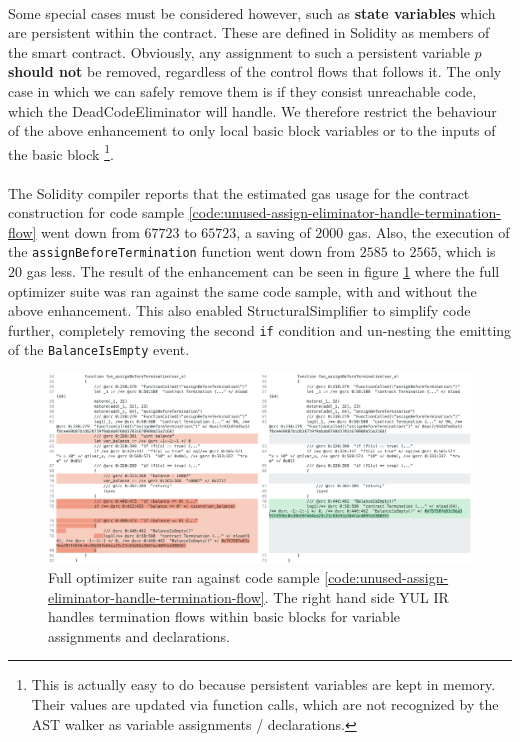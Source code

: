 \paragraph*{}
Some special cases must be considered however, such as \textbf{state variables} which are persistent within the contract. These are defined in Solidity as members of the smart contract. Obviously, any assignment to such a persistent variable $p$ \textbf{should not} be removed, regardless of the control flows that follows it. The only case in which we can safely remove them is if they consist unreachable code, which the DeadCodeEliminator will handle. We therefore restrict the behaviour of the above enhancement to only local basic block variables or to the inputs of the basic block \footnote{This is actually easy to do because persistent variables are kept in memory. Their values are updated via function calls, which are not recognized by the AST walker as variable assignments / declarations.}.

\paragraph*{}
The Solidity compiler reports that the estimated gas usage for the contract construction for code sample \ref*{code:unused-assign-eliminator-handle-termination-flow} went down from $67723$ to $65723$, a saving of $2000$ gas. Also, the execution of the \lstinline[columns=fixed]{assignBeforeTermination} function went down from $2585$ to $2565$, which is $20$ gas less. The result of the enhancement can be seen in figure \ref{fig:unused-assign-eliminator-handle-termination-flow} where the full optimizer suite was ran against the same code sample, with and without the above enhancement. This also enabled StructuralSimplifier to simplify code further, completely removing the second \lstinline[columns=fixed]{if} condition and un-nesting the emitting of the \lstinline[columns=fixed]{BalanceIsEmpty} event.


\begin{figure}
    \centering
    \includegraphics[width=\textwidth]{images/unused_assign_eliminator_handle_termination_flow.png}
    \caption{Full optimizer suite ran against code sample \ref{code:unused-assign-eliminator-handle-termination-flow}. The right hand side YUL IR handles termination flows within basic blocks for variable assignments and declarations.}
    \label{fig:unused-assign-eliminator-handle-termination-flow}
\end{figure}



